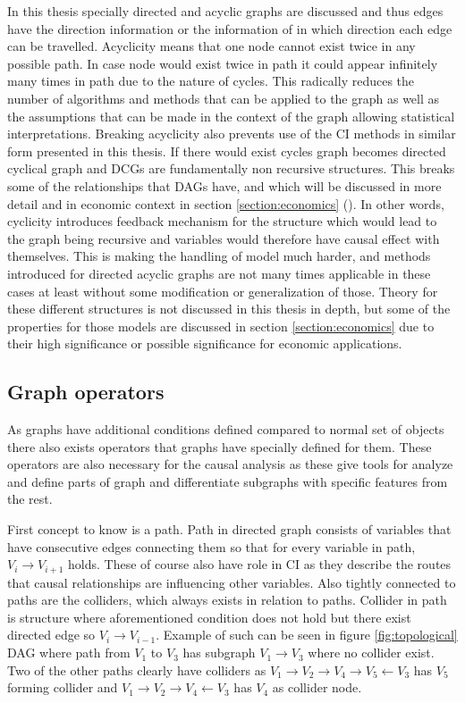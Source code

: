 \documentclass[main=english,12pt,a4paper,pdftex,econ,utf8]{aaltothesis}
\begin{document}


In this thesis specially directed and acyclic graphs are discussed and thus edges have the direction information or the information of in which direction each edge can be travelled. Acyclicity means that one node cannot exist twice in any possible path. In case node would exist twice in path it could appear infinitely many times in path due to the nature of cycles. This radically reduces the number of algorithms and methods that can be applied to the graph as well as the assumptions that can be made in the context of the graph allowing statistical interpretations. Breaking acyclicity also prevents use of the CI methods in similar form presented in this thesis. If there would exist cycles graph becomes directed cyclical graph and DCGs are fundamentally non recursive structures. This breaks some of the relationships that DAGs have, and which will be discussed in more detail and in economic context in section \ref{section:economics} (\cite{Heckman2015}). In other words, cyclicity introduces feedback mechanism for the structure which would lead to the graph being recursive and variables would therefore have causal effect with themselves. This is making the handling of model much harder, and methods introduced for directed acyclic graphs are not many times applicable in these cases at least without some modification or generalization of those. Theory for these different structures is not discussed in this thesis in depth, but some of the properties for those models are discussed in section \ref{section:economics} due to their high significance or possible significance for economic applications.

\subsection{Graph operators}

As graphs have additional conditions defined compared to normal set of objects there also exists operators that graphs have specially defined for them. These operators are also necessary for the causal analysis as these give tools for analyze and define parts of graph and differentiate subgraphs with specific features from the rest.

First concept to know is a path. Path in directed graph consists of variables that have consecutive edges connecting them so that for every variable in path, $V_{i}\rightarrow V_{i+1}$ holds. These of course also have role in CI as they describe the routes that causal relationships are influencing other variables. Also tightly connected to paths are the colliders, which always exists in relation to paths. Collider in path is structure where aforementioned condition does not hold but there exist directed edge so $V_{i}\rightarrow V_{i-1}$. Example of such can be seen in figure \ref{fig:topological} DAG where path from $V_{1}$ to $V_{3}$ has subgraph $V_{1}\rightarrow V_{3}$ where no collider exist. Two of the other paths clearly have colliders as $V_{1}\rightarrow V_{2}\rightarrow V_{4}\rightarrow V_{5}\leftarrow V_{3}$ has $V_{5}$ forming collider and $V_{1}\rightarrow V_{2}\rightarrow V_{4}\leftarrow V_{3}$ has $V_{4}$ as collider node.
\end{document}
